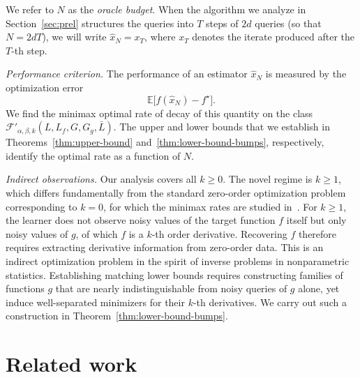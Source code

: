 \documentclass{article}
\renewcommand{\geq}{\geqslant}
\renewcommand{\hat}{\widehat}
\theoremstyle{definition}
\begin{document}
We refer to $N$ as the \emph{oracle budget}. When the algorithm we
analyze in Section~\ref{sec:prel} structures the queries into $T$
steps of $2d$ queries (so that $N=2dT$), we will write
$\hat{x}_N=x_T$, where $x_T$ denotes the iterate produced after the
$T$-th step.

\medskip
\noindent\textit{Performance criterion.}
The performance of an estimator $\hat{x}_N$ is 
measured by the optimization error
\[
\mathbb{E}\bigl[f(\hat{x}_N)-f^\star\bigr].
\]
We find the minimax optimal rate of decay of this quantity 
on the class $\mathcal{F}'_{\alpha,\beta,k}(L,L_f,G,G_g,\bar{L})$. The upper and lower bounds that we 
establish in Theorems~\ref{thm:upper-bound} 
and~\ref{thm:lower-bound-bumps}, respectively, identify the optimal rate as a function of $N$.

\medskip
\noindent\textit{Indirect observations.}
Our analysis covers all $k\geq 0$. The novel regime is $k\geq 1$, which
differs fundamentally from the standard zero-order optimization problem
corresponding to $k=0$, for which the minimax rates are studied 
in~\cite{polyak1990optimal,shamir2013complexity,akhavan2020exploiting,
akhavan2024gradient}. For $k\geq 1$, the learner does not observe noisy
values of the target function $f$ itself but only noisy values of $g$, of which $f$ is a $k$-th order derivative. Recovering $f$ therefore requires 
extracting derivative information from zero-order data. This is an 
indirect optimization problem in the spirit of inverse problems 
in nonparametric statistics.  Establishing matching lower bounds requires 
constructing families of functions $g$ that are nearly 
indistinguishable from noisy queries of $g$ alone, yet 
induce well-separated minimizers for their $k$-th derivatives. 
We carry out such a construction in 
Theorem~\ref{thm:lower-bound-bumps}.











\section{Related work}
\label{sec:related}
\end{document}
